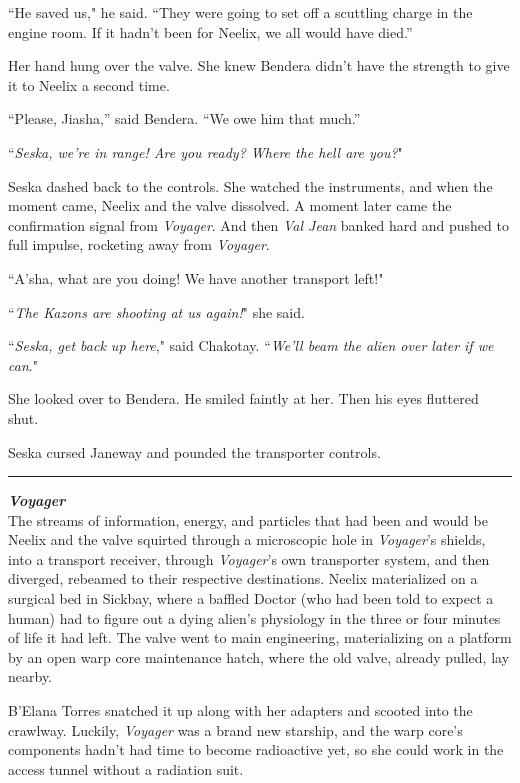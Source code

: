 \documentclass[twoside,letterpaper,12pt]{memoir}
\begin{document}
``He saved us," he said. ``They were going to set off a scuttling charge in the engine room. If it hadn't been for Neelix, we all would have died.”

Her hand hung over the valve. She knew Bendera didn’t have the strength to give it to Neelix a second time.

``Please, Jiasha,” said Bendera. ``We owe him that much.”

``\textit{Seska, we're in range! Are you ready? Where the hell are you?}"

Seska dashed back to the controls. She watched the instruments, and when the moment came, Neelix and the valve dissolved. A moment later came the confirmation signal from \textit{Voyager}. And then \textit{Val Jean} banked hard and pushed to full impulse, rocketing away from \textit{Voyager}.

``A'sha, what are you doing! We have another transport left!"

``\textit{The Kazons are shooting at us again!}" she said.

``\textit{Seska, get back up here}," said Chakotay. ``\textit{We'll beam the alien over later if we can}."

She looked over to Bendera. He smiled faintly at her. Then his eyes fluttered shut.

Seska cursed Janeway and pounded the transporter controls.

\begin{center}\rule{3cm}{0.4 pt}\end{center}

\noindent\textit{\textbf{Voyager}}\\

The streams of information, energy, and particles that had been and would be Neelix and the valve squirted through a microscopic hole in \textit{Voyager}'s shields, into a transport receiver, through \textit{Voyager}'s own transporter system, and then diverged, rebeamed to their respective destinations. Neelix materialized on a surgical bed in Sickbay, where a baffled Doctor (who had been told to expect a human) had to figure out a dying alien's physiology in the three or four minutes of life it had left. The valve went to main engineering, materializing on a platform by an open warp core maintenance hatch, where the old valve, already pulled, lay nearby.

B'Elana Torres snatched it up along with her adapters and scooted into the crawlway. Luckily, \textit{Voyager} was a brand new starship, and the warp core's components hadn't had time to become radioactive yet, so she could work in the access tunnel without a radiation suit.
\end{document}
